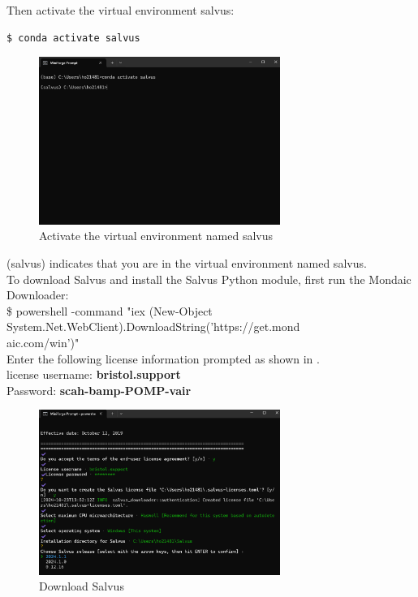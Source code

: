\documentclass[a4paper, 12pt]{article}
\theoremstyle{plain}
\begin{document}
\noindent
Then activate the virtual environment salvus:

\begin{lstlisting}[language=bash]
$ conda activate salvus
\end{lstlisting}
\vspace{1cm}


\begin{figure}[H]
  \centering
  \includegraphics[width=0.7\textwidth]{activate_salvus}
  \caption{Activate the virtual environment named salvus}
\end{figure}

(salvus) indicates that you are in the virtual environment named salvus.\\

\noindent
To download Salvus and install the Salvus Python module, first run the Mondaic Downloader: \\

\noindent
\$  \hspace{0.1cm} powershell -command "iex (New-Object System.Net.WebClient).DownloadString('https://get.mond\\aic.com/win')" \\



\noindent
Enter the following license information prompted as shown in .\\
 
\noindent
license username: \textbf{bristol.support} \\
Password: \textbf{scah-bamp-POMP-vair}\\

\begin{figure}[H]
  \centering
  \includegraphics[width=0.7\textwidth]{downloader}
  \caption{Download Salvus}
    \label{fig:Download}
\end{figure}
\end{document}
